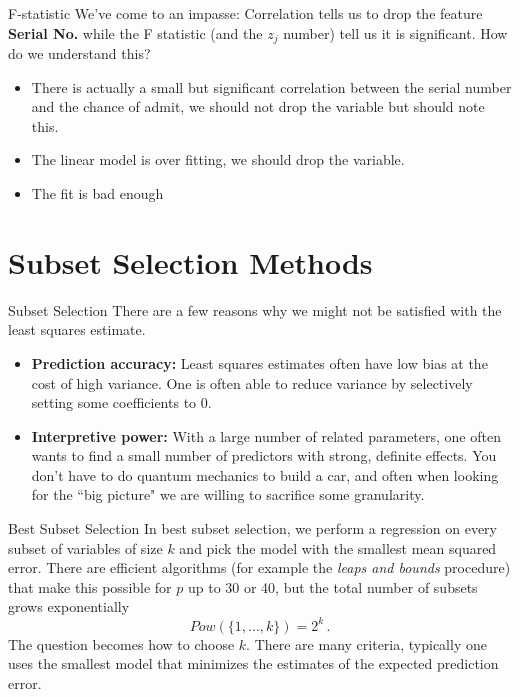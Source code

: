 \documentclass[10pt, table, dvipsnames,xcdraw, handout ]{beamer}
\begin{document}
\begin{frame}[fragile]{F-statistic}
We've come to an impasse: Correlation tells us to drop the feature \textbf{Serial No.} while the F statistic (and the $z_j$ number) tell us it is significant. How do we understand this?

\begin{itemize}
\item There is actually a small but significant correlation between the serial number and the chance of admit, we should not drop the variable but should note this.\pause
\item The linear model is over fitting, we should drop the variable.  \pause
\item The fit is bad enough 
\end{itemize}
\end{frame}




\section{Subset Selection Methods}


\begin{frame}[fragile]{Subset Selection}
There are a few reasons why we might not be satisfied with the least squares estimate. \pause

\begin{itemize}
\item[] \textbf{Prediction accuracy:} Least squares estimates often have low bias at the cost of high variance. One is often able to reduce variance by selectively setting some coefficients to 0.\pause
\item[] \textbf{Interpretive power:} With a large number of related parameters, one often wants to find a small number of predictors with strong, definite effects. You don't have to do quantum mechanics to build a car, and often when looking for the ``big picture" we are willing to sacrifice some granularity.  
\end{itemize}
\end{frame}



\begin{frame}[fragile]{Best Subset Selection}
In best subset selection, we perform a regression on every subset of variables of size $k$ and pick the model with the smallest mean squared error. \pause There are efficient algorithms (for example the \emph{leaps and bounds} procedure) that make this possible for $p$ up to 30 or 40, but the total number of subsets grows exponentially
$$
Pow(\{1,\ldots, k\}) = 2^k\,.
$$\pause
The question becomes how to choose $k$. There are many criteria, typically one uses the smallest model that minimizes the estimates of the expected prediction error. 
\end{frame}
\end{document}
